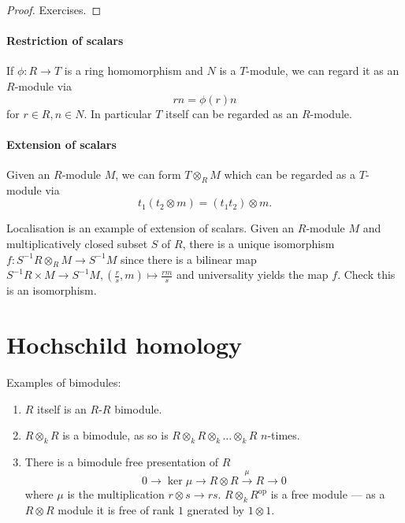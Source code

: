 \documentclass[a4paper]{article}
\begin{document}
\begin{proof}
  Exercises.
\end{proof}

\paragraph{Restriction of scalars}

If \(\phi: R \to T\) is a ring homomorphism and \(N\) is a \(T\)-module, we can regard it as an \(R\)-module via
\[
  r n = \phi(r)n
\]
for \(r \in R, n \in N\). In particular \(T\) itself can be regarded as an \(R\)-module.

\paragraph{Extension of scalars}

Given an \(R\)-module \(M\), we can form \(T \otimes_R M\) which can be regarded as a \(T\)-module via
\[
  t_1(t_2 \otimes m) = (t_1t_2) \otimes m.
\]

\begin{eg}
  Localisation is an example of extension of scalars. Given an \(R\)-module \(M\) and multiplicatively closed subset \(S\) of \(R\), there is a unique isomorphism \(f: S^{-1}R \otimes_R M \to S^{-1}M\) since there is a bilinear map \(S^{-1}R \times M \to S^{-1}M, (\frac{r}{s}, m) \mapsto \frac{rm}{s}\) and universality yields the map \(f\). Check this is an isomorphism.
\end{eg}














\iffalse
\section{Hochschild homology}

\begin{eg}
  Examples of bimodules:
  \begin{enumerate}
  \item \(R\) itself is an \(R\)-\(R\) bimodule.
  \item \(R \otimes_k R\) is a bimodule, as so is \(R \otimes_k R \otimes_k \dots \otimes_k R\) \(n\)-times.
  \item There is a bimodule free presentation of \(R\)
    \[
      0 \to \ker \mu \to R \otimes R \xrightarrow{\mu} R \to 0
    \]
    where \(\mu\) is the multiplication \(r \otimes s \to rs\). \(R \otimes_k R^{\text{op}}\) is a free module --- as a \(R \otimes R\) module it is free of rank \(1\) gnerated by \(1 \otimes 1\).
  \end{enumerate}
\end{eg}
\end{document}
